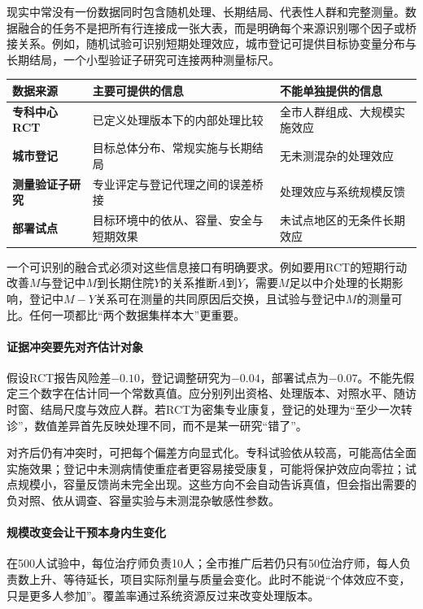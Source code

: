现实中常没有一份数据同时包含随机处理、长期结局、代表性人群和完整测量。数据融合的任务不是把所有行连接成一张大表，而是明确每个来源识别哪个因子或桥接关系。例如，随机试验可识别短期处理效应，城市登记可提供目标协变量分布与长期结局，一个小型验证子研究可连接两种测量标尺。

\begin{center}
\small
\begin{tabularx}{\textwidth}{>{\bfseries}p{2.2cm}X X}
\toprule
数据来源 & 主要可提供的信息 & 不能单独提供的信息\\
\midrule
专科中心RCT & 已定义处理版本下的内部处理比较 & 全市人群组成、大规模实施效应\\
城市登记 & 目标总体分布、常规实施与长期结局 & 无未测混杂的处理效应\\
测量验证子研究 & 专业评定与登记代理之间的误差桥接 & 处理效应与系统规模反馈\\
部署试点 & 目标环境中的依从、容量、安全与短期效果 & 未试点地区的无条件长期效应\\
\bottomrule
\end{tabularx}
\end{center}

一个可识别的融合式必须对这些信息接口有明确要求。例如要用RCT的短期行动改善$M$与登记中$M$到长期住院$Y$的关系推断$A$到$Y$，需要$M$足以中介处理的长期影响，登记中$M-Y$关系可在测量的共同原因后交换，且试验与登记中$M$的测量可比。任何一项都比“两个数据集样本大”更重要。

\paragraph{证据冲突要先对齐估计对象}

假设RCT报告风险差$-0.10$，登记调整研究为$-0.04$，部署试点为$-0.07$。不能先假定三个数字在估计同一个常数真值。应分别列出资格、处理版本、对照水平、随访时窗、结局尺度与效应人群。若RCT为密集专业康复，登记的处理为“至少一次转诊”，数值差异首先反映处理不同，而不是某一研究“错了”。

对齐后仍有冲突时，可把每个偏差方向显式化。专科试验依从较高，可能高估全面实施效果；登记中未测病情使重症者更容易接受康复，可能将保护效应向零拉；试点规模小，容量反馈尚未完全出现。这些方向不会自动告诉真值，但会指出需要的负对照、依从调查、容量实验与未测混杂敏感性参数。

\paragraph{规模改变会让干预本身内生变化}

在500人试验中，每位治疗师负责10人；全市推广后若仍只有50位治疗师，每人负责数上升、等待延长，项目实际剂量与质量会变化。此时不能说“个体效应不变，只是更多人参加”。覆盖率通过系统资源反过来改变处理版本。

